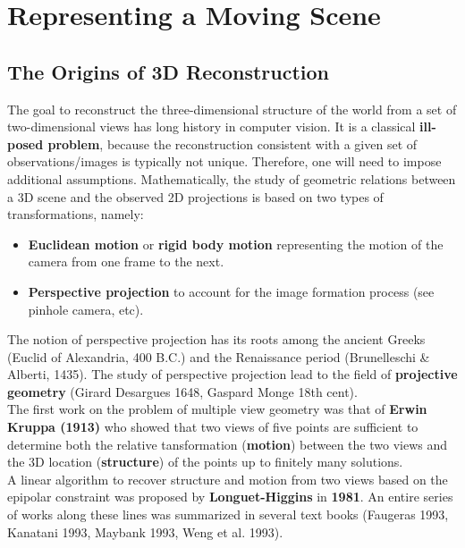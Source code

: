 \section{Representing a Moving Scene}%
\label{sec:moving_scene}


\subsection{The Origins of 3D Reconstruction}%
\label{sub:the_origins_of_3d_reconstruction}

The goal to reconstruct the three-dimensional structure of the world from
a set of two-dimensional views has long history in computer vision.
It is a classical \textbf{ill-posed problem}, because the reconstruction
consistent with a given set of observations/images is typically not unique.
Therefore, one will need to impose additional assumptions.
Mathematically, the study of geometric relations between a 3D scene
and the observed 2D projections is based on two types of transformations, namely:
\begin{itemize}
	\item \textbf{Euclidean motion} or \textbf{rigid body motion}
		representing the motion of the camera from one frame to the next.
	\item \textbf{Perspective projection} to account for the image formation
		process (see pinhole camera, etc).
\end{itemize}

The notion of perspective projection has its roots among the ancient Greeks
(Euclid of Alexandria, \roughly{} 400 B.C.) and the Renaissance period
(Brunelleschi \& Alberti, 1435).
The study of perspective projection lead to the field of
\textbf{projective geometry} (Girard Desargues 1648, Gaspard Monge 18th cent).\\

The first work on the problem of multiple view geometry was that of
\textbf{Erwin Kruppa (1913)} who showed that two views of five points
are sufficient to determine both the relative tansformation
(\textbf{motion}) between the two views and the 3D location (\textbf{structure})
of the points up to finitely many solutions.\\

A linear algorithm to recover structure and motion from two views based
on the epipolar constraint was proposed by \textbf{Longuet-Higgins}
in \textbf{1981}. An entire series of works along these lines was summarized
in several text books (Faugeras 1993, Kanatani 1993,
Maybank 1993, Weng et al. 1993).\\


